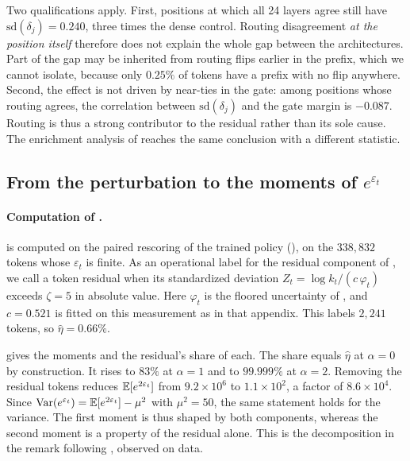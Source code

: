 Two qualifications apply. First, positions at which all 24 layers agree still
have $\mathrm{sd}(\delta_j)=0.240$, three times the dense control. Routing
disagreement \emph{at the position itself} therefore does not explain the
whole gap between the architectures. Part of the gap may be inherited from
routing flips earlier in the prefix, which we cannot isolate, because only
$0.25\%$ of tokens have a prefix with no flip anywhere. Second, the effect is
not driven by near-ties in the gate: among positions whose routing agrees, the
correlation between $\mathrm{sd}(\delta_j)$ and the gate margin is $-0.087$.
Routing is thus a strong contributor to the residual rather than its sole
cause. The enrichment analysis of  reaches the same
conclusion with a different statistic.

\subsection{From the perturbation to the moments of $e^{\varepsilon_t}$}
\label{app:mgf}

\paragraph{Computation of .}
 is computed on the paired rescoring of the trained policy
(), on the $338{,}832$ tokens whose $\varepsilon_t$ is
finite. As an operational label for the residual component of
, we call a token residual when its standardized
deviation $Z_t=\log k_t/(c\,\varphi_t)$ exceeds $\zeta=5$ in absolute value.
Here $\varphi_t$ is the floored uncertainty of , and
$c=0.521$ is fitted on this measurement as in that appendix. This labels
$2{,}241$ tokens, so $\hat\eta=0.66\%$.

 gives the moments and the residual's share of each. The
share equals $\hat\eta$ at $\alpha=0$ by construction. It rises to $83\%$ at
$\alpha=1$ and to $99.999\%$ at $\alpha=2$. Removing the residual tokens
reduces $\mathbb{E}[e^{2\varepsilon_t}]$ from $9.2\times10^6$ to $1.1\times10^2$, a
factor of $8.6\times10^4$. Since
$\operatorname{Var}(e^{\varepsilon_t})=\mathbb{E}[e^{2\varepsilon_t}]-\mu^2$ with
$\mu^2=50$, the same statement holds for the variance. The first moment is
thus shaped by both components, whereas the second moment is a property of
the residual alone. This is the decomposition in the remark following
, observed on data.

